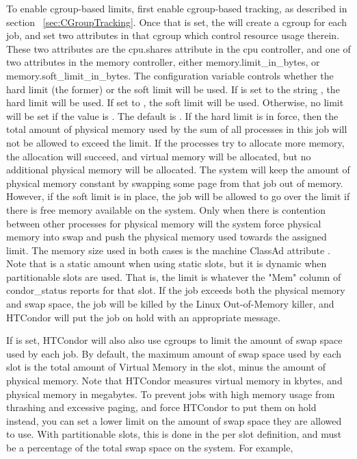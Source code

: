 To enable cgroup-based limits, first enable cgroup-based tracking, as
described in section ~\ref{sec:CGroupTracking}.  
Once that is set,
the  will create a cgroup for each job, and set two
attributes in that cgroup which control resource usage therein.  
These
two attributes are the cpu.shares attribute in the cpu controller, and one
of two attributes in the memory controller, either memory.limit\_in\_bytes, or 
memory.soft\_limit\_in\_bytes.  
The configuration variable  controls
whether the hard limit (the former) or the soft limit will be used.  
If  is set to the string , 
the hard limit will be used.
If set to , the soft limit will be used.  
Otherwise, no limit will be set if the value is .
The default is .
If the hard limit is in force, then the total amount of physical memory
used by the sum of all processes in this job will not be allowed to exceed
the limit.  
If the processes try to allocate more memory, the allocation will
succeed, and virtual memory will be allocated, 
but no additional physical memory will be allocated.
The system will keep the amount of physical memory constant by swapping some
page from that job out of memory.  
However, if the soft limit is in place,
the job will be allowed to go over the limit if there is free memory 
available on the system.  
Only when there is contention between other processes for physical memory
will the system force physical memory into swap and push
the physical memory used towards the assigned limit.
The memory size used in both cases is the machine ClassAd attribute
.
Note that  is 
a static amount when using static slots, but it is dynamic when partitionable 
slots are used.  That is, the limit is whatever the "Mem" column of
condor\_status reports for that slot.  If the job exceeds both the physical 
memory and swap space, the job will be killed by the Linux Out-of-Memory 
killer, and HTCondor will put the job on hold with an appropriate message.

If  is set, HTCondor will also also
use cgroups to limit the amount of swap space used by each job.  By default, 
the maximum amount of swap space used by each slot is the total amount of 
Virtual Memory in the slot, minus the amount of physical memory.  
Note that HTCondor measures virtual memory in kbytes, and physical 
memory in megabytes.  To prevent jobs with high
memory usage from thrashing and excessive paging, and force HTCondor to
put them on hold instead, you can set a lower limit on the amount of
swap space they are allowed to use.  With partitionable slots, this is
done in the per slot definition, and must be a percentage of the total
swap space on the system. For example,

